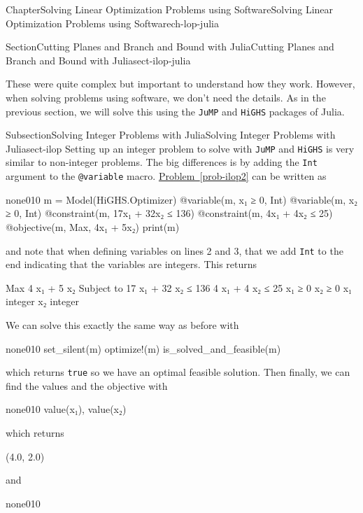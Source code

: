 \documentclass[oneside,10pt,]{book}
\newcommand{\xreffont}{\relax}
\newcommand{\mono}[1]{\texttt{#1}}
\numberwithin{equation}{section}
\begin{document}
\begin{chapterptx}{Chapter}{Solving Linear Optimization Problems using Software}{}{Solving Linear Optimization Problems using Software}{}{}{ch-lop-julia}
\begin{sectionptx}{Section}{Cutting Planes and Branch and Bound with Julia}{}{Cutting Planes and Branch and Bound with Julia}{}{}{sect-ilop-julia}
\begin{introduction}{}
\par
These were quite complex but important to understand how they work. However, when solving problems using software, we don't need the details. As in the previous section, we will solve this using the \mono{JuMP} and \mono{HiGHS} packages of Julia.%
\end{introduction}%
%
%
\typeout{************************************************}
\typeout{************************************************}
%
\begin{subsectionptx}{Subsection}{Solving Integer Problems with Julia}{}{Solving Integer Problems with Julia}{}{}{sect-ilop}
Setting up an integer problem to solve with \mono{JuMP} and \mono{HiGHS} is very similar to non-integer problems. The big differences is by adding the \mono{Int} argument to the \mono{@variable} macro. \hyperref[prob-ilop2]{Problem~{\xreffont\ref{prob-ilop2}}} can be written as%
\begin{programnumbered}{none}{0}{1}{0}
m = Model(HiGHS.Optimizer)
@variable(m, x₁ ≥ 0, Int)
@variable(m, x₂ ≥ 0, Int)
@constraint(m, 17x₁ + 32x₂ ≤ 136)
@constraint(m, 4x₁ + 4x₂ ≤ 25)
@objective(m, Max, 4x₁ + 5x₂)
print(m)
\end{programnumbered}
and note that when defining variables on lines 2 and 3, that we add \mono{Int} to the end indicating that the variables are integers. This returns%
\par
%
\begin{codedisplay}
Max 4 x₁ + 5 x₂
  Subject to
   17 x₁ + 32 x₂ ≤ 136
   4 x₁ + 4 x₂ ≤ 25
   x₁ ≥ 0
   x₂ ≥ 0
   x₁ integer
   x₂ integer
\end{codedisplay}
%
\par
We can solve this exactly the same way as before with%
\begin{program}{none}{0}{1}{0}
set_silent(m)
optimize!(m)
is_solved_and_feasible(m)
\end{program}
which returns \mono{true} so we have an optimal feasible solution.  Then finally, we can find the values and the objective with%
\begin{program}{none}{0}{1}{0}
value(x₁), value(x₂)
\end{program}
which returns%
\par
%
\begin{codedisplay}
(4.0, 2.0)
\end{codedisplay}
%
\par
and%
\begin{program}{none}{0}{1}{0}

\end{program}
\end{subsectionptx}
\end{sectionptx}
\end{chapterptx}
\end{document}
